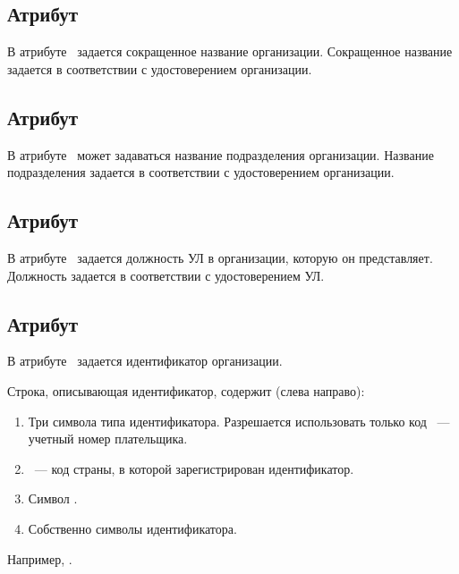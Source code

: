 \subsection{Атрибут }\label{ENTITIES.Id.O}

В атрибуте~ задается сокращенное название организации.
%
Сокращенное название задается в соответствии с удостоверением организации.
%

\subsection{Атрибут }\label{ENTITIES.Id.OU}

В атрибуте~ может задаваться название 
подразделения организации.
%
Название подразделения задается в соответствии с удостоверением организации.
%

\subsection{Атрибут }\label{ENTITIES.Id.T}

В атрибуте~ задается должность УЛ в организации, которую он 
представляет. Должность задается в соответствии с удостоверением УЛ.
%

\subsection{Атрибут }\label{ENTITIES.Id.ORGID}

В атрибуте~ задается идентификатор организации.

Строка, описывающая идентификатор, содержит (слева направо):
\begin{enumerate}
\item
Три символа типа идентификатора. Разрешается использовать только код
~--- учетный номер плательщика.

\item
{}~--- код страны, в которой зарегистрирован идентификатор.

\item
Символ \str{-}.
\item
Собственно символы идентификатора.
\end{enumerate}

Например, .
